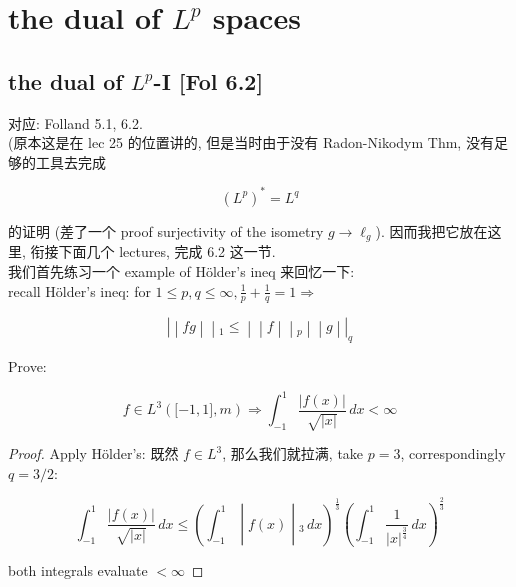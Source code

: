 \documentclass{qlnotes-export}
\begin{document}
\chapter{\texorpdfstring{the dual of \(L^{p}\) spaces}{the dual of L\^{}\{p\} spaces}}\label{the-dual-of-lp-spaces}

\section{\texorpdfstring{the dual of \(L^{p}\)-I {[}Fol 6.2{]}}{the dual of L\^{}\{p\}-I {[}Fol 6.2{]}}}

对应: Folland 5.1, 6.2.\\
(原本这是在 lec 25 的位置讲的, 但是当时由于没有 Radon-Nikodym Thm, 没有足够的工具去完成

\[(L^{p})^{\ast} = L^{q}\]

的证明 (差了一个 proof surjectivity of the isometry \(g\rightarrow\ell_{g}\)). 因而我把它放在这里, 衔接下面几个 lectures, 完成 6.2 这一节.\\
我们首先练习一个 example of Hölder's ineq 来回忆一下:\\
recall Hölder's ineq: for \(1 \leq p,q \leq \infty,\frac{1}{p} + \frac{1}{q} = 1\Longrightarrow\)

\[\left. | \middle| fg \middle| \middle| {}_{1} \leq \middle| \middle| f \middle| \middle| {}_{p} \middle| \middle| g \middle| |_{q} \right.\]

\begin{example}\label{ex-13-the-dual-of-l-p-spaces-example-001}

Prove:

\[f \in L^{3}(\lbrack - 1,1\rbrack,m)\Longrightarrow\int_{- 1}^{1}\frac{|f(x)|}{\sqrt{|x|}}\, dx < \infty\]

\end{example}

\begin{proof}

Apply Hölder's: 既然 \(f \in L^{3}\), 那么我们就拉满, take \(p = 3\), correspondingly \(q = 3/2\):

\[\left. \int_{- 1}^{1}\frac{|f(x)|}{\sqrt{|x|}}\, dx \leq (\int_{- 1}^{1} \middle| f(x) \middle| {}_{3}\, dx)^{\frac{1}{3}}(\int_{- 1}^{1}\frac{1}{|x|^{\frac{3}{4}}}\, dx)^{\frac{2}{3}} \right.\]

both integrals evaluate \(< \infty\)

\end{proof}
\end{document}
